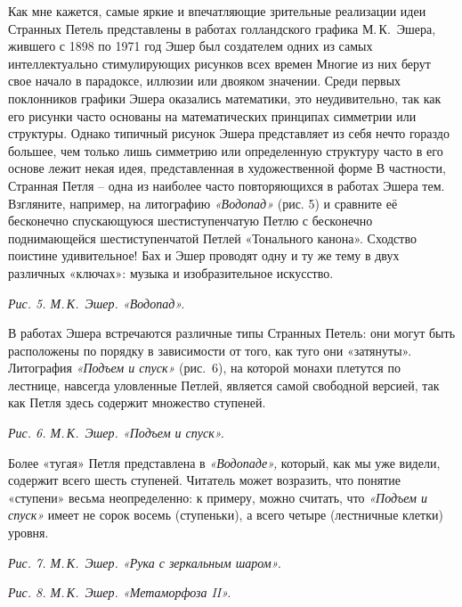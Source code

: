 \documentclass[../main.tex]{subfiles}
\begin{document}
Как мне кажется, самые яркие и впечатляющие зрительные реализации идеи Странных Петель представлены в работах голландского графика М.\,К.~Эшера, жившего с 1898 по 1971 год Эшер был создателем одних из самых интеллектуально стимулирующих рисунков всех времен Многие из них берут свое начало в парадоксе, иллюзии или двояком значении. Среди первых поклонников графики Эшера оказались математики, это неудивительно, так как его рисунки часто основаны на математических принципах симметрии или структуры. Однако типичный рисунок Эшера представляет из себя нечто гораздо большее, чем только лишь симметрию или определенную структуру часто в его основе лежит некая идея, представленная в художественной форме В частности, Странная Петля \--- одна из наиболее часто повторяющихся в работах Эшера тем. Взгляните, например, на литографию \emph{«Водопад»} (рис. 5) и сравните её бесконечно спускающуюся шестиступенчатую Петлю с бесконечно поднимающейся шестиступенчатой Петлей «Тонального канона». Сходство поистине удивительное! Бах и Эшер проводят одну и ту же тему в двух различных «ключах»: музыка и изобразительное искусство.

\emph{Рис. 5. М.\,К.~Эшер. «Водопад».}

В работах Эшера встречаются различные типы Странных Петель: они могут быть расположены по порядку в зависимости от того, как туго они «затянуты». Литография \emph{«Подъем и спуск»} (рис.~6), на которой монахи плетутся по лестнице, навсегда уловленные Петлей, является самой свободной версией, так как Петля здесь содержит множество ступеней.

\emph{Рис. 6. М.\,К.~Эшер. «Подъем и спуск».}

Более «тугая» Петля представлена в \emph{«Водопаде»,} который, как мы уже видели, содержит всего шесть ступеней. Читатель может возразить, что понятие «ступени» весьма неопределенно: к примеру, можно считать, что \emph{«Подъем и спуск»} имеет не сорок восемь (ступеньки), а всего четыре (лестничные клетки) уровня.

\emph{Рис. 7. М.\,К.~Эшер. «Рука с зеркальным шаром».}

\emph{Рис. 8. М.\,К.~Эшер. «Метаморфоза II».}
\end{document}

